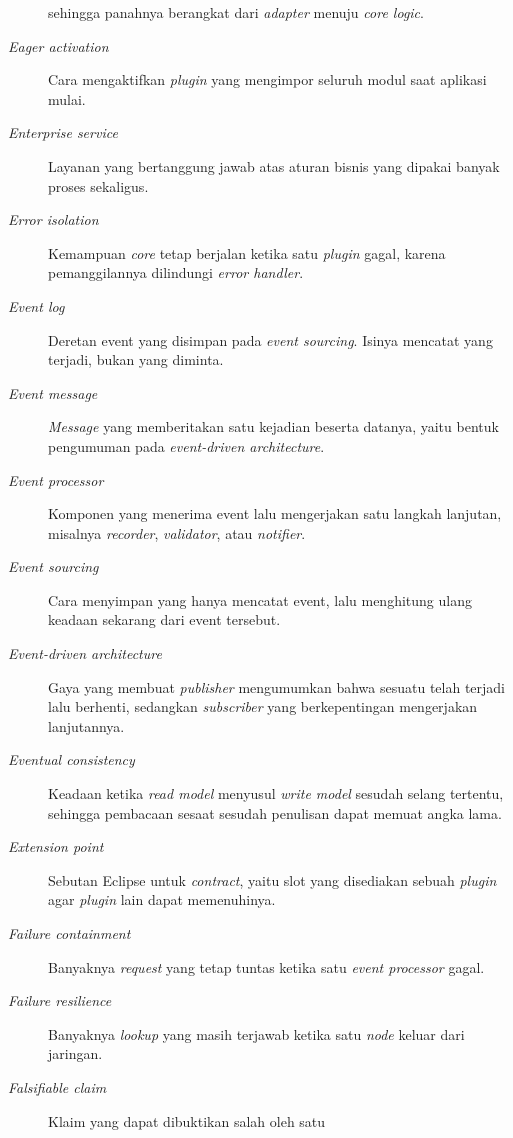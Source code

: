 \begin{description}
    sehingga panahnya berangkat dari \textit{adapter} menuju \textit{core
    logic}.
  \item[\textit{Eager activation}] Cara mengaktifkan \textit{plugin} yang
    mengimpor seluruh modul saat aplikasi mulai.
  \item[\textit{Enterprise service}] Layanan yang bertanggung jawab atas
    aturan bisnis yang dipakai banyak proses sekaligus.
  \item[\textit{Error isolation}] Kemampuan \textit{core} tetap berjalan ketika
    satu \textit{plugin} gagal, karena pemanggilannya dilindungi \textit{error
    handler}.
  \item[\textit{Event log}] Deretan event yang disimpan pada \textit{event
    sourcing}. Isinya mencatat yang terjadi, bukan yang diminta.
  \item[\textit{Event message}] \textit{Message} yang memberitakan satu
    kejadian beserta datanya, yaitu bentuk pengumuman pada
    \textit{event-driven architecture}.
  \item[\textit{Event processor}] Komponen yang menerima event lalu mengerjakan
    satu langkah lanjutan, misalnya \textit{recorder}, \textit{validator}, atau
    \textit{notifier}.
  \item[\textit{Event sourcing}] Cara menyimpan yang hanya mencatat event, lalu
    menghitung ulang keadaan sekarang dari event tersebut.
  \item[\textit{Event-driven architecture}] Gaya yang membuat \textit{publisher}
    mengumumkan bahwa sesuatu telah terjadi lalu berhenti, sedangkan
    \textit{subscriber} yang berkepentingan mengerjakan lanjutannya.
  \item[\textit{Eventual consistency}] Keadaan ketika \textit{read model}
    menyusul \textit{write model} sesudah selang tertentu, sehingga pembacaan sesaat sesudah penulisan
    dapat memuat angka lama.
  \item[\textit{Extension point}] Sebutan Eclipse untuk \textit{contract}, yaitu
    slot yang disediakan sebuah \textit{plugin} agar \textit{plugin} lain dapat
    memenuhinya.
  \item[\textit{Failure containment}] Banyaknya \textit{request} yang tetap
    tuntas ketika satu \textit{event processor} gagal.
  \item[\textit{Failure resilience}] Banyaknya \textit{lookup} yang masih
    terjawab ketika satu \textit{node} keluar dari jaringan.
  \item[\textit{Falsifiable claim}] Klaim yang dapat dibuktikan salah oleh satu

\end{description}
